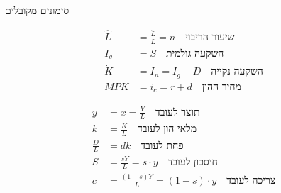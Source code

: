 \documentclass[usenames,dvipsnames]{beamer}
\begin{document}
\begin{RTL}
\begin{frame}[allowframebreaks]
    \framebreak



    \framebreak
    
    \begin{block}{סימונים מקובלים}
        \begin{minipage}[t]{0.5\textwidth}
            \begin{align*}
            \hat{L} &= \frac{\dot{L}}{L} = n \quad \text{שיעור הריבוי} \\
            I_g &= S \quad \text{השקעה גולמית} \\
            \dot{K} &= I_n = I_g - D \quad \text{השקעה נקייה}\\
            MPK &= i_c = r + d \quad \text{מחיר ההון}
            \end{align*}
        \end{minipage}%
        \begin{minipage}[t]{0.5\textwidth}
            \begin{align*}
            y &= x =  \frac{Y}{L} \quad \text{תוצר לעובד} \\
            k &= \frac{K}{L} \quad \text{מלאי הון לעובד} \\
             \frac{D}{L} &= dk \quad  \text{פחת לעובד} \\
            S &= \frac{sY}{L} = s \cdot y \quad \text{חיסכון לעובד} \\
            c &= \frac{(1-s)Y}{L} = (1 - s) \cdot y \quad \text{צריכה לעובד}
            \end{align*}
        \end{minipage}
    \end{block}


\end{frame}
\end{RTL}
\end{document}
